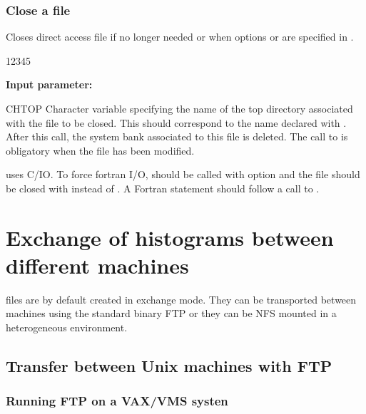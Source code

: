 \subsubsection*{Close a file}
\label{HCLOSFIL} 

 
\Action
Closes direct access file if no longer needed or
when options  or  are specified in .
 
\begin{DLtt}{12345}
\item[{\rm\bf Input parameter:}]
\item[CHTOP]
Character variable specifying the name of the top directory
associated with the file to be closed. This should correspond to the
name declared with .
After this call, the system bank associated to this file is deleted.
The call to  is obligatory when the file
has been modified.
\end{DLtt}

 uses C/IO. To force fortran I/O, 
should be called with option  and the file should be closed
with  instead of .  A Fortran 
statement should follow a call to .
 
\finalnewpage%

\section{Exchange of histograms between different machines}
\label{sec:histogram-transfer}

\HBOOK{} files are by default created in exchange mode. 
They can be transported between machines using the standard
binary FTP or they can be NFS mounted in a heterogeneous environment.

\subsection*{Transfer between Unix machines with FTP}


\subsubsection*{Running FTP on a VAX/VMS systen}

